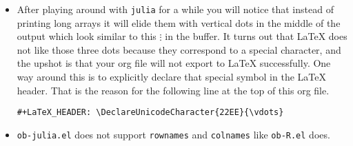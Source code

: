 \documentclass[11pt]{article}
\begin{document}
\begin{itemize}
\item After playing around with \texttt{julia} for a while you will notice that
instead of printing long arrays it will elide them with vertical
dots in the middle of the output which look similar to this \(
  \vdots \) in the buffer.  It turns out that \LaTeX{} does not like
those three dots because they correspond to a special character, and
the upshot is that your org file will not export to \LaTeX{}
successfully.  One way around this is to explicitly declare that
special symbol in the \LaTeX{} header. That is the reason for the
following line at the top of this org file.

\begin{verbatim}
#+LaTeX_HEADER: \DeclareUnicodeCharacter{22EE}{\vdots}
\end{verbatim}

\item \texttt{ob-julia.el} does not support \texttt{rownames} and \texttt{colnames} like
  \texttt{ob-R.el} does.
\end{itemize}
\end{document}

